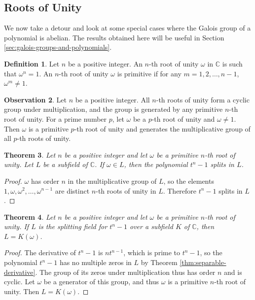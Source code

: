 \documentclass[12pt]{article}
\newtheorem{theorem}{Theorem}
\theoremstyle{definition}
\newtheorem{definition}[theorem]{Definition}
\newtheorem{observation}[theorem]{\textbf{Observation}}
\begin{document}
\subsection{Roots of Unity}
We now take a detour and look at some special cases where the Galois group of a polynomial is abelian. The results obtained here will be useful in Section \ref{sec:galois-groups-and-polynomials}. 

\begin{definition}
	Let $n$ be a positive integer. An $n$-th root of unity $\omega$ in $\mathbb C$ is such that $\omega ^ n = 1$. An $n$-th root of unity $\omega$ is primitive if for any $m = 1, 2, \dots, n - 1$, $\omega ^ m \neq 1$.
\end{definition}

\begin{observation}
	Let $n$ be a positive integer. All $n$-th roots of unity form a cyclic group under multiplication, and the group is generated by any primitive $n$-th root of unity. For a prime number $p$, let $\omega$ be a $p$-th root of unity and $\omega \neq 1$. Then $\omega$ is a primitive $p$-th root of unity and generates the multiplicative group of all $p$-th roots of unity.
\end{observation}

\begin{theorem} \label{thm:unity-1}
	Let $n$ be a positive integer and let $\omega$ be a primitive $n$-th root of unity. Let $L$ be a subfield of $\mathbb C$. If $\omega \in L$, then the polynomial $t^n - 1$ splits in $L$.
\end{theorem}
\begin{proof}
	$\omega$ has order $n$ in the multiplicative group of $L$, so the elements $1, \omega, \omega^2, \ldots, \omega^{n-1}$ are distinct $n$-th roots of unity in $L$. Therefore $t^n-1$ splits in $L$.
\end{proof}

\begin{theorem} \label{thm:unity-2}
	Let $n$ be a positive integer and let $\omega$ be a primitive $n$-th root of unity. If $L$ is the splitting field for $t^n - 1$ over a subfield $K$ of $\mathbb C$, then $L = K(\omega)$.
\end{theorem}

\begin{proof}
	The derivative of $t^n-1$ is $n t^{n-1}$, which is prime to $t^n-1$, so the polynomial $t^n-1$ has no multiple zeros in $L$ by Theorem \ref{thm:separable-derivative}. The group of its zeros under multiplication thus has order $n$ and is cyclic. Let $\omega$ be a generator of this group, and thus $\omega$ is a primitive $n$-th root of unity. Then $L=K(\omega)$. 
\end{proof}
\end{document}
